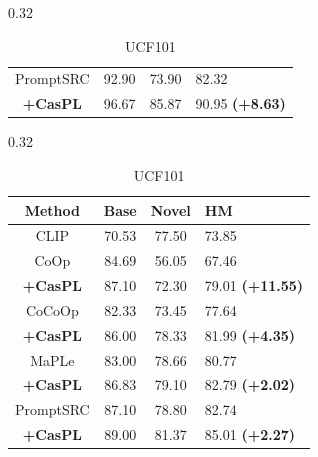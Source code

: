 \documentclass[runningheads]{llncs}
\newcommand{\improve}[1]{\textcolor{boost_line}{\textbf{#1}}}
\begin{document}
{{\begin{table}[!t]
\begin{subtable}[t]{0.32\linewidth}
{\begin{tabular}{c|ccl}
            \hline
            PromptSRC & 92.90 & 73.90 & 82.32 \\
            \rowcolor{tablecolor} \textbf{+CasPL} &96.67 	&85.87 	&90.95   \improve{(+8.63)} \\
            \hline
        \end{tabular}
        }
        \caption{EuroSAT}
    \end{subtable}
    \begin{subtable}[t]{0.32\linewidth}
        \resizebox{0.96\linewidth}{!}
        {
        \begin{tabular}{c|ccl}
            \hline
            Method    &  Base  & Novel & HM \\
            \hline
            CLIP & 70.53 & 77.50 & 73.85 \\
            \hline
            CoOp & 84.69 & 56.05 & 67.46 \\
            \rowcolor{tablecolor} \textbf{+CasPL} &87.10 	&72.30 	&79.01     \small\improve{(+11.55)}  \\
            \hline
            CoCoOp & 82.33 & 73.45 & 77.64 \\
            \rowcolor{tablecolor} \textbf{+CasPL} &86.00 	&78.33 	&81.99    \improve{(+4.35)} \\
            \hline
            MaPLe & 83.00 & 78.66 & 80.77 \\
            \rowcolor{tablecolor} \textbf{+CasPL} &86.83 	&79.10 	&82.79   \improve{(+2.02)} \\
            \hline
            PromptSRC & 87.10 & 78.80 & 82.74 \\
            \rowcolor{tablecolor} \textbf{+CasPL} &89.00 	&81.37 	&85.01   \improve{(+2.27)} \\
            \hline
        \end{tabular}
        }
        \caption{UCF101}
    \end{subtable}
    \label{table:base-to-novel}
\end{table}


}}
\end{document}
